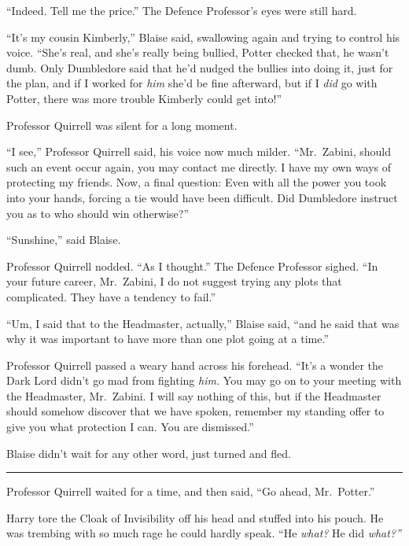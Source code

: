 ``Indeed. Tell me the price.'' The Defence Professor's eyes were still
hard.

``It's my cousin Kimberly,'' Blaise said, swallowing again and trying to
control his voice. ``She's real, and she's really being bullied, Potter
checked that, he wasn't dumb. Only Dumbledore said that he'd nudged the
bullies into doing it, just for the plan, and if I worked for \emph{him}
she'd be fine afterward, but if I \emph{did} go with Potter, there was
more trouble Kimberly could get into!''

Professor Quirrell was silent for a long moment.

``I see,'' Professor Quirrell said, his voice now much milder.
``Mr.~Zabini, should such an event occur again, you may contact me
directly. I have my own ways of protecting my friends. Now, a final
question: Even with all the power you took into your hands, forcing a
tie would have been difficult. Did Dumbledore instruct you as to who
should win otherwise?''

``Sunshine,'' said Blaise.

Professor Quirrell nodded. ``As I thought.'' The Defence Professor
sighed. ``In your future career, Mr.~Zabini, I do not suggest trying any
plots that complicated. They have a tendency to fail.''

``Um, I said that to the Headmaster, actually,'' Blaise said, ``and he
said that was why it was important to have more than one plot going at a
time.''

Professor Quirrell passed a weary hand across his forehead. ``It's a
wonder the Dark Lord didn't go mad from fighting \emph{him.} You may go
on to your meeting with the Headmaster, Mr.~Zabini. I will say nothing
of this, but if the Headmaster should somehow discover that we have
spoken, remember my standing offer to give you what protection I can.
You are dismissed.''

Blaise didn't wait for any other word, just turned and fled.

\begin{center}\rule{3in}{0.4pt}\end{center}

Professor Quirrell waited for a time, and then said, ``Go ahead,
Mr.~Potter.''

Harry tore the Cloak of Invisibility off his head and stuffed into his
pouch. He was trembing with so much rage he could hardly speak. ``He
\emph{what?} He did \emph{what?''}

